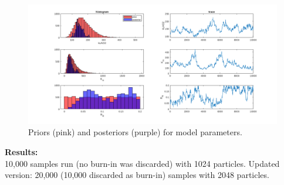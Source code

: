 \documentclass{ruthesis}
\begin{document}
\begin{figure}
	\centerline{\includegraphics[width=1.3\textwidth]{images_microalgae/plots_iterative/model_parameters}}
	\caption[.]{Priors (pink) and posteriors (purple) for model parameters.}
	\label{fig:micro_exp_iterative_parameters_model}
\end{figure}


\textbf{Results:}\\
10,000 samples run (no burn-in was discarded) with 1024 particles.
Updated version: 20,000 (10,000 discarded as burn-in) samples with 2048 particles.



{}


%
%
\end{document}
